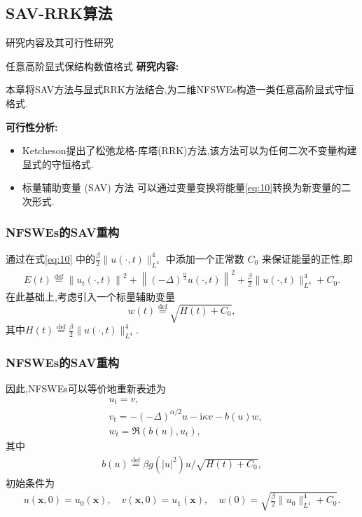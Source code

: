 \documentclass[aspectratio=169]{beamer}
\numberwithin{theorem}{section} %
\numberwithin{equation}{section}%
\numberwithin{figure}{section}%
\numberwithin{table}{section}%
\begin{document}
\subsection{SAV-RRK算法}
\begin{frame}{研究内容及其可行性研究}
	\begin{block}{任意高阶显式保结构数值格式}
		\textbf{\textcolor[rgb]{0.227,0.373,0.306}{研究内容:}}
		
		{\footnotesize 本章将SAV方法与显式RRK方法结合,为二维NFSWEs构造一类任意高阶显式守恒格式.}
		
		\textbf{\textcolor[rgb]{0.227,0.373,0.306}{可行性分析:}}
		\begin{itemize}
			\item {\footnotesize Ketcheson\cite{ketchesonRelaxationRungeKutta2019}提出了松弛龙格-库塔(RRK)方法,该方法可以为任何二次不变量构建显式的守恒格式.}%
			\item {\footnotesize 标量辅助变量 (SAV) 方法 \cite{chengConvergenceEnergyconservingScheme2022} 可以通过变量变换将能量\eqref{eq:10}转换为新变量的二次形式.}%
			\end{itemize}
	\end{block}
	\end{frame}
	
\begin{frame}\frametitle{NFSWEs的SAV重构}
	通过在式\eqref{eq:10} 中的$\frac{\beta}{2}\|u(\cdot, t)\|_{L^{4}}^{4}$ 中添加一个正常数 $C_0$ 来保证能量的正性,即
	\begin{align}\label{eq_SAVRRK:9_1}
		E(t)\overset{\text{def}}{=}\left\|u_{t}(\cdot, t)\right\|^{2}+\left\|(-\Delta)^{\frac{\alpha}{4}} u(\cdot, t)\right\|^{2}+\frac{\beta}{2}\|u(\cdot, t)\|_{L^{4}}^{4} + C_0.
	\end{align}
	在此基础上,考虑引入一个标量辅助变量
	\begin{equation}
		w(t)\overset{\text{def}}{=}\sqrt{H(t)+C_0},
	\end{equation}
	其中$H(t)\overset{\text{def}}{=}\frac{\beta}{2}\|u(\cdot, t)\|_{L^{4}}^{4} .$
\end{frame}

\begin{frame}\frametitle{NFSWEs的SAV重构}
因此,NFSWEs可以等价地重新表述为
{\color{purple}\begin{align}
& u_t=v, \label{eq_SAVRRK:2-2}\\
& v_t=-(-\Delta)^{\alpha / 2} u-\mathrm{i}\kappa v-b(u) w, \label{eq_SAVRRK:2-3}\\
& w_t=\Re\left(b(u), u_t\right),\label{eq_SAVRRK:2-4}
\end{align}}
其中
\begin{align}
b(u)\overset{\text{def}}{=}\beta g(|u|^2) u / \sqrt{H(t)+C_0},
\end{align}
初始条件为
\begin{align}\label{eq_SAVRRK:31}
	u(\boldsymbol{x}, 0)=u_{0}(\boldsymbol{x}), \quad v(\boldsymbol{x}, 0)=u_{1}(\boldsymbol{x}), \quad w(0)=\sqrt{\frac{\beta}{2}\|u_{0}\|_{L^{4}}^{4} +C_0}.
\end{align}
\end{frame}
\end{document}
